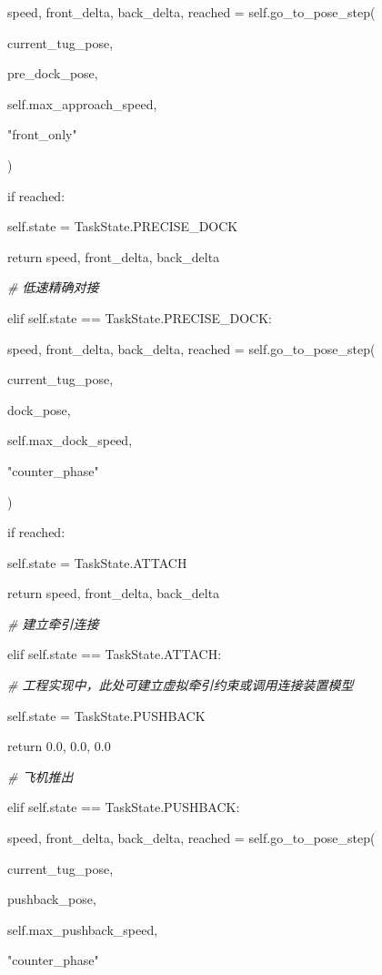             speed, front\_delta, back\_delta, reached = self.go\_to\_pose\_step(

                current\_tug\_pose,

                pre\_dock\_pose,

                self.max\_approach\_speed,

                "front\_only"

            )

            if reached:

                self.state = TaskState.PRECISE\_DOCK

            return speed, front\_delta, back\_delta

        \emph{\# 低速精确对接}

        elif self.state == TaskState.PRECISE\_DOCK:

            speed, front\_delta, back\_delta, reached = self.go\_to\_pose\_step(

                current\_tug\_pose,

                dock\_pose,

                self.max\_dock\_speed,

                "counter\_phase"

            )

            if reached:

                self.state = TaskState.ATTACH

            return speed, front\_delta, back\_delta

        \emph{\# 建立牵引连接}

        elif self.state == TaskState.ATTACH:

            \emph{\# 工程实现中，此处可建立虚拟牵引约束或调用连接装置模型}

            self.state = TaskState.PUSHBACK

            return 0.0, 0.0, 0.0

        \emph{\# 飞机推出}

        elif self.state == TaskState.PUSHBACK:

            speed, front\_delta, back\_delta, reached = self.go\_to\_pose\_step(

                current\_tug\_pose,

                pushback\_pose,

                self.max\_pushback\_speed,

                "counter\_phase"

